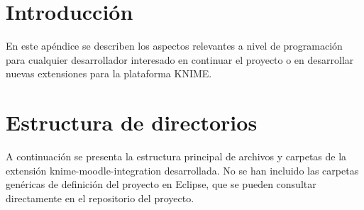 \label{sec:appendixD}

\section{Introducción}

En este apéndice se describen los aspectos relevantes a nivel de programación para cualquier 
desarrollador interesado en continuar el proyecto o en desarrollar nuevas extensiones para la 
plataforma KNIME. 
\

\section{Estructura de directorios}

A continuación se presenta la estructura principal de archivos y carpetas de la extensión 
knime-moodle-integration desarrollada. No se han incluido las carpetas genéricas de definición 
del proyecto en Eclipse, que se pueden consultar directamente en el repositorio del proyecto. 

